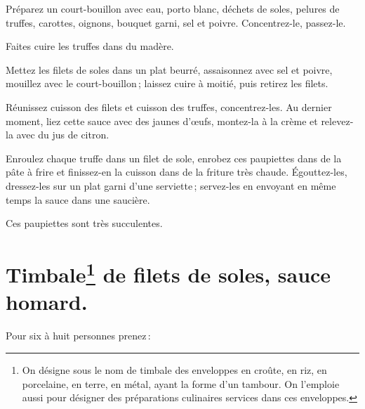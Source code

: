 Préparez un court-bouillon avec eau, porto blanc, déchets de soles, pelures de
truffes, carottes, oignons, bouquet garni, sel et poivre. Concentrez-le,
passez-le.

Faites cuire les truffes dans du madère.

Mettez les filets de soles dans un plat beurré, assaisonnez avec sel et poivre,
mouillez avec le court-bouillon ; laissez cuire à moitié, puis retirez les
filets.

Réunissez cuisson des filets et cuisson des truffes, concentrez-les. Au dernier
moment, liez cette sauce avec des jaunes d'œufs, montez-la à la crème et
relevez-la avec du jus de citron.

Enroulez chaque truffe dans un filet de sole, enrobez ces paupiettes dans de la
pâte à frire et finissez-en la cuisson dans de la friture très chaude.
Égouttez-les, dressez-les sur un plat garni d'une serviette ; servez-les en
envoyant en même temps la sauce dans une saucière.

Ces paupiettes sont très succulentes.

\section*{\centering Timbale\footnote{
On désigne sous le nom de timbale des enveloppes en croûte, en
riz, en porcelaine, en terre, en métal, ayant la forme d'un tambour.
\protect\endgraf
On l'emploie aussi pour désigner des préparations culinaires services dans ces
enveloppes.} de filets de soles, sauce homard.}


Pour six à huit personnes prenez :

\medskip

